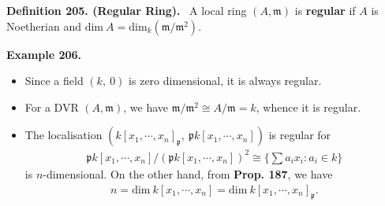 \documentclass[12pt,a4paper,footinclude=true,headinclude=true]{scrbook} %
\newenvironment{definition}[2][Definition]
    { \begin{mdframed}[backgroundcolor=gray!20] \textbf{#1 #2.}\ }
    {  \end{mdframed}}
\newenvironment{example}[2][Example]
    { \begin{mdframed}[backgroundcolor=gray!20] \textbf{#1 #2.} }
    {  \end{mdframed}}
\begin{document}
\begin{definition}{205. (Regular Ring)}
    A local ring $(A,\mathfrak{m})$ is \textbf{regular} if $A$ is Noetherian and $\mathrm{dim}\ A=\mathrm{dim}_k(\mathfrak{m}/\mathfrak{m}^2)$.
\end{definition}
\newpage
\begin{example}{206}
    \begin{itemize}
        \item[(a)] Since a field $(k,\ 0)$ is zero dimensional, it is always regular.
        \item[(b)] For a DVR $(A,\mathfrak{m})$, we have $\mathfrak{m}/\mathfrak{m}^2\cong A/\mathfrak{m}=k$, whence it is regular.
        \item[(c)] The localisation $(k[x_1,\cdots,x_n]_\mathfrak{p},\ \mathfrak{p}k[x_1,\cdots,x_n])$ is regular for
        \begin{align*}
            \mathfrak{p}k[x_1,\cdots,x_n]/(\mathfrak{p}k[x_1,\cdots,x_n])^2\cong \{\sum a_ix_i:a_i\in k\}
        \end{align*}
        is $n$-dimensional. On the other hand, from \textbf{Prop. 187}, we have
        \begin{align*}
            n=\mathrm{dim}\ k[x_1,\cdots,x_n]=\mathrm{dim}\ k[x_1,\cdots,x_n]_\mathfrak{p}.
        \end{align*}
    \end{itemize}
\end{example}
\end{document}
